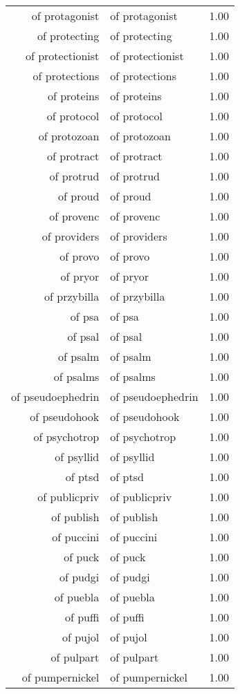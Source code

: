 \begin{table}[ht]
\begin{tabular}{rlr}
  of protagonist & of protagonist & 1.00 \\ 
  of protecting & of protecting & 1.00 \\ 
  of protectionist & of protectionist & 1.00 \\ 
  of protections & of protections & 1.00 \\ 
  of proteins & of proteins & 1.00 \\ 
  of protocol & of protocol & 1.00 \\ 
  of protozoan & of protozoan & 1.00 \\ 
  of protract & of protract & 1.00 \\ 
  of protrud & of protrud & 1.00 \\ 
  of proud & of proud & 1.00 \\ 
  of provenc & of provenc & 1.00 \\ 
  of providers & of providers & 1.00 \\ 
  of provo & of provo & 1.00 \\ 
  of pryor & of pryor & 1.00 \\ 
  of przybilla & of przybilla & 1.00 \\ 
  of psa & of psa & 1.00 \\ 
  of psal & of psal & 1.00 \\ 
  of psalm & of psalm & 1.00 \\ 
  of psalms & of psalms & 1.00 \\ 
  of pseudoephedrin & of pseudoephedrin & 1.00 \\ 
  of pseudohook & of pseudohook & 1.00 \\ 
  of psychotrop & of psychotrop & 1.00 \\ 
  of psyllid & of psyllid & 1.00 \\ 
  of ptsd & of ptsd & 1.00 \\ 
  of publicpriv & of publicpriv & 1.00 \\ 
  of publish & of publish & 1.00 \\ 
  of puccini & of puccini & 1.00 \\ 
  of puck & of puck & 1.00 \\ 
  of pudgi & of pudgi & 1.00 \\ 
  of puebla & of puebla & 1.00 \\ 
  of puffi & of puffi & 1.00 \\ 
  of pujol & of pujol & 1.00 \\ 
  of pulpart & of pulpart & 1.00 \\ 
  of pumpernickel & of pumpernickel & 1.00 \\ 

\end{tabular}
\end{table}
